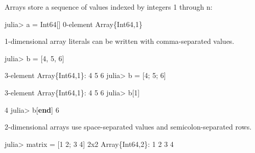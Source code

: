 \documentclass[ignorenonframetext,]{beamer}
\newenvironment{Shaded}{}{}
\newcommand{\KeywordTok}[1]{\textcolor[rgb]{0.00,0.44,0.13}{\textbf{{#1}}}}
\newcommand{\DataTypeTok}[1]{\textcolor[rgb]{0.56,0.13,0.00}{{#1}}}
\newcommand{\FloatTok}[1]{\textcolor[rgb]{0.25,0.63,0.44}{{#1}}}
\newcommand{\NormalTok}[1]{{#1}}
\begin{document}
\begin{frame}[fragile]{Arrays store a sequence of values indexed by
integers 1 through n:}

\begin{Shaded}
\begin{Highlighting}[]
\NormalTok{julia> a = }\DataTypeTok{Int64}\NormalTok{[] }
\FloatTok{0}\NormalTok{-element }\DataTypeTok{Array}\NormalTok{\{}\DataTypeTok{Int64}\NormalTok{,}\FloatTok{1}\NormalTok{\}}
\end{Highlighting}
\end{Shaded}

\end{frame}

\begin{frame}[fragile]{1-dimensional array literals can be written with
comma-separated values.}

\begin{Shaded}
\begin{Highlighting}[]
\NormalTok{julia> b = [}\FloatTok{4}\NormalTok{, }\FloatTok{5}\NormalTok{, }\FloatTok{6}\NormalTok{]}

\FloatTok{3}\NormalTok{-element }\DataTypeTok{Array}\NormalTok{\{}\DataTypeTok{Int64}\NormalTok{,}\FloatTok{1}\NormalTok{\}:}
 \FloatTok{4}
 \FloatTok{5}
 \FloatTok{6}
\NormalTok{julia> b = [}\FloatTok{4}\NormalTok{; }\FloatTok{5}\NormalTok{; }\FloatTok{6}\NormalTok{]}

\FloatTok{3}\NormalTok{-element }\DataTypeTok{Array}\NormalTok{\{}\DataTypeTok{Int64}\NormalTok{,}\FloatTok{1}\NormalTok{\}:}
 \FloatTok{4}
 \FloatTok{5}
 \FloatTok{6}
\NormalTok{julia> b[}\FloatTok{1}\NormalTok{]}

\FloatTok{4}
\NormalTok{julia> b[}\KeywordTok{end}\NormalTok{]}
\FloatTok{6}
\end{Highlighting}
\end{Shaded}

\end{frame}

\begin{frame}[fragile]{2-dimensional arrays use space-separated values
and semicolon-separated rows.}

\begin{Shaded}
\begin{Highlighting}[]
\NormalTok{julia> matrix = [}\FloatTok{1} \FloatTok{2}\NormalTok{; }\FloatTok{3} \FloatTok{4}\NormalTok{]}
\FloatTok{2}\NormalTok{x2 }\DataTypeTok{Array}\NormalTok{\{}\DataTypeTok{Int64}\NormalTok{,}\FloatTok{2}\NormalTok{\}:}
 \FloatTok{1}  \FloatTok{2}
 \FloatTok{3}  \FloatTok{4}
\end{Highlighting}
\end{Shaded}

\end{frame}
\end{document}
